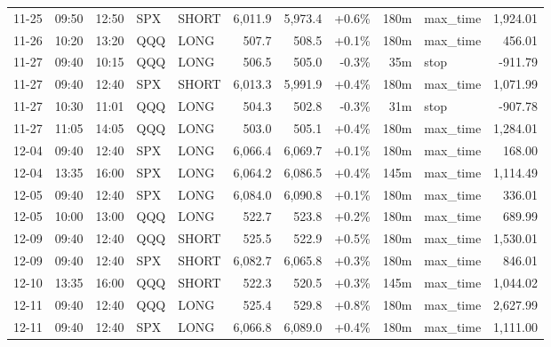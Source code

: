 \documentclass[11pt,a4paper,twoside]{article}
\begin{document}
\begin{center}
\begin{longtable}{>{\color{txtmain}}l l l l l r r r r >{\color{txtmain}}l r}
11-25 & 09:50 & 12:50 & SPX & SHORT & 6,011.9 & 5,973.4 & \textcolor{wingreen}{+0.6\%} & 180m & max\_time & \textcolor{wingreen}{1,924.01} \\
11-26 & 10:20 & 13:20 & QQQ & LONG & 507.7 & 508.5 & \textcolor{wingreen}{+0.1\%} & 180m & max\_time & \textcolor{wingreen}{456.01} \\
11-27 & 09:40 & 10:15 & QQQ & LONG & 506.5 & 505.0 & \textcolor{lossred}{-0.3\%} & 35m & stop & \textcolor{lossred}{-911.79} \\
11-27 & 09:40 & 12:40 & SPX & SHORT & 6,013.3 & 5,991.9 & \textcolor{wingreen}{+0.4\%} & 180m & max\_time & \textcolor{wingreen}{1,071.99} \\
11-27 & 10:30 & 11:01 & QQQ & LONG & 504.3 & 502.8 & \textcolor{lossred}{-0.3\%} & 31m & stop & \textcolor{lossred}{-907.78} \\
11-27 & 11:05 & 14:05 & QQQ & LONG & 503.0 & 505.1 & \textcolor{wingreen}{+0.4\%} & 180m & max\_time & \textcolor{wingreen}{1,284.01} \\
12-04 & 09:40 & 12:40 & SPX & LONG & 6,066.4 & 6,069.7 & \textcolor{wingreen}{+0.1\%} & 180m & max\_time & \textcolor{wingreen}{168.00} \\
12-04 & 13:35 & 16:00 & SPX & LONG & 6,064.2 & 6,086.5 & \textcolor{wingreen}{+0.4\%} & 145m & max\_time & \textcolor{wingreen}{1,114.49} \\
12-05 & 09:40 & 12:40 & SPX & LONG & 6,084.0 & 6,090.8 & \textcolor{wingreen}{+0.1\%} & 180m & max\_time & \textcolor{wingreen}{336.01} \\
12-05 & 10:00 & 13:00 & QQQ & LONG & 522.7 & 523.8 & \textcolor{wingreen}{+0.2\%} & 180m & max\_time & \textcolor{wingreen}{689.99} \\
12-09 & 09:40 & 12:40 & QQQ & SHORT & 525.5 & 522.9 & \textcolor{wingreen}{+0.5\%} & 180m & max\_time & \textcolor{wingreen}{1,530.01} \\
12-09 & 09:40 & 12:40 & SPX & SHORT & 6,082.7 & 6,065.8 & \textcolor{wingreen}{+0.3\%} & 180m & max\_time & \textcolor{wingreen}{846.01} \\
12-10 & 13:35 & 16:00 & QQQ & SHORT & 522.3 & 520.5 & \textcolor{wingreen}{+0.3\%} & 145m & max\_time & \textcolor{wingreen}{1,044.02} \\
12-11 & 09:40 & 12:40 & QQQ & LONG & 525.4 & 529.8 & \textcolor{wingreen}{+0.8\%} & 180m & max\_time & \textcolor{wingreen}{2,627.99} \\
12-11 & 09:40 & 12:40 & SPX & LONG & 6,066.8 & 6,089.0 & \textcolor{wingreen}{+0.4\%} & 180m & max\_time & \textcolor{wingreen}{1,111.00} \\

\end{longtable}
\end{center}
\end{document}
